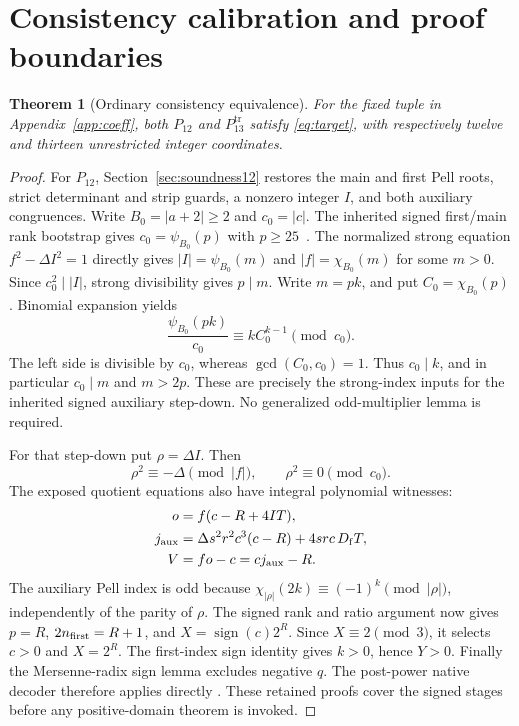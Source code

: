 \documentclass[11pt,a4paper]{article}
\newtheorem{theorem}{Theorem}[section]
\theoremstyle{definition}\newtheorem{definition}[theorem]{Definition}
\theoremstyle{remark}\newtheorem{remark}[theorem]{Remark}
\numberwithin{equation}{section}
\begin{document}


\section{Consistency calibration and proof boundaries}
\label{sec:calibration}

\begin{theorem}[Ordinary consistency equivalence]
For the fixed tuple in Appendix~\ref{app:coeff}, both $P_{12}$ and
$P_{13}^{\mathrm{tr}}$ satisfy \eqref{eq:target}, with respectively
twelve and thirteen unrestricted integer coordinates.
\end{theorem}
\begin{proof}
For $P_{12}$, Section~\ref{sec:soundness12} restores the main and first
Pell roots, strict determinant and strip guards, a nonzero integer $I$,
and both auxiliary congruences. Write $B_0=|a+2|\ge2$ and
$c_0=|c|$. The inherited signed first/main rank bootstrap gives
$c_0=\psi_{B_0}(p)$ with $p\ge25$~\cite{signed,guards}.
The normalized strong equation $f^2-\Delta I^2=1$ directly gives
$|I|=\psi_{B_0}(m)$ and $|f|=\chi_{B_0}(m)$ for some $m>0$.
Since $c_0^2\mid|I|$, strong divisibility gives $p\mid m$.
Write $m=pk$, and put $C_0=\chi_{B_0}(p)$. Binomial expansion yields
\[
 \frac{\psi_{B_0}(pk)}{c_0}\equiv kC_0^{k-1}\pmod{c_0}.
\]
The left side is divisible by $c_0$, whereas $\gcd(C_0,c_0)=1$.
Thus $c_0\mid k$, and in particular $c_0\mid m$ and $m>2p$.
These are precisely the strong-index inputs for the inherited signed
auxiliary step-down. No generalized odd-multiplier lemma is required.

For that step-down put $\rho=\Delta I$. Then
\[
 \rho^2\equiv-\Delta\pmod{|f|},\qquad
 \rho^2\equiv0\pmod{c_0}.
\]
The exposed quotient equations also have integral polynomial witnesses:
\begin{align*}
 o&=f(c-R+4IT),\\
 j_{\rm aux}
   &=\Delta s^2r^2c^3(c-R)+4src\,D_{\mathrm f} T,\\
 V&=fo-c=cj_{\rm aux}-R.
\end{align*}
The auxiliary Pell index is odd because
$\chi_{|\rho|}(2k)\equiv(-1)^k\pmod{|\rho|}$, independently of
the parity of $\rho$. The signed rank and ratio argument now gives
$p=R$, $2n_{\rm first}=R+1$, and $X=\operatorname{sign}(c)2^R$.
Since $X\equiv2\pmod3$, it selects $c>0$ and $X=2^R$.
The first-index sign identity gives $k>0$, hence $Y>0$.
Finally the Mersenne-radix sign lemma excludes negative $q$.
The post-power native decoder therefore applies directly
\cite{signed,guards}. These retained proofs cover the signed stages
before any positive-domain theorem is invoked.


\end{proof}
\end{document}
